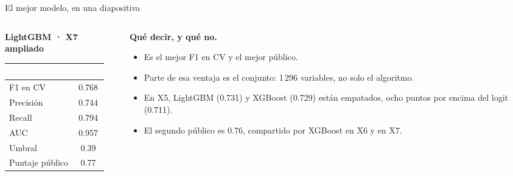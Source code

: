 \documentclass[aspectratio=169,10pt]{beamer}
\newcommand{\mejor}{\rowcolor{uniandesYellow}}
\newcommand{\hh}[1]{\cellcolor{uniandesInk}\textcolor{white}{\textbf{#1}}}
\begin{document}
\begin{frame}{El mejor modelo, en una diapositiva}
  \begin{columns}[T,onlytextwidth]
    \begin{column}{0.52\textwidth}
      \textbf{LightGBM · X7 ampliado}
      \vspace{0.35em}
      \footnotesize
      \begin{tabular}{@{}lc@{}}
        \toprule
        \hh{Dato} & \hh{Valor} \\
        \midrule
        \mejor F1 en CV & 0.768 \\
        Precisión & 0.744 \\
        Recall & 0.794 \\
        AUC & 0.957 \\
        Umbral & 0.39 \\
        \mejor Puntaje público & 0.77 \\
        \bottomrule
      \end{tabular}
    \end{column}
    \begin{column}{0.46\textwidth}
      \textbf{Qué decir, y qué no.}
      \begin{itemize}
        \item Es el mejor F1 en CV y el mejor público.
        \item Parte de esa ventaja es el conjunto: 1\,296 variables, no solo el algoritmo.
        \item En X5, LightGBM (0.731) y XGBoost (0.729) están empatados, ocho puntos por encima del logit (0.711).
        \item El segundo público es 0.76, compartido por XGBoost en X6 y en X7.
      \end{itemize}
    \end{column}
  \end{columns}
\end{frame}
\end{document}
